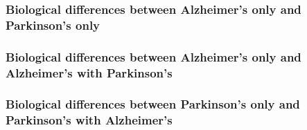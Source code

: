 \subsubsection{Biological differences between Alzheimer's only and Parkinson's only}
\label{subsubsec:biol-diff-betw-3}

\subsubsection{Biological differences between Alzheimer's only and Alzheimer's with Parkinson's}
\label{subsubsec:biol-diff-betw-4}

\subsubsection{Biological differences between Parkinson's only and Parkinson's with Alzheimer's}
\label{subsubsec:biol-diff-betw-5}

\pagebreak






